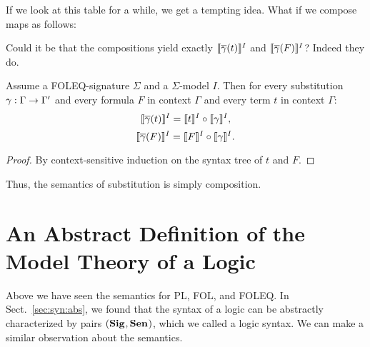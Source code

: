 If we look at this table for a while, we get a tempting idea. What if we compose maps as follows:

\begin{center}
\end{center}

Could it be that the compositions yield exactly $\llbracket \overline{\gamma}(t)\rrbracket^{I}$ and $\llbracket \overline{\gamma}(F)\rrbracket^{I}$? Indeed they do.

\begin{theorem}
Assume a FOLEQ-signature $\Sigma$ and a $\Sigma$-model $I$. Then for every substitution $\gamma:\Gamma\rightarrow\Gamma'$ and every formula $F$ in context $\Gamma$ and every term $t$ in context $\Gamma$:
 \[\llbracket \overline{\gamma}(t)\rrbracket^{I}=\llbracket t\rrbracket^{I}\circ\llbracket \gamma\rrbracket^{I},\]
 \[\llbracket \overline{\gamma}(F)\rrbracket^{I}=\llbracket F\rrbracket^{I}\circ\llbracket \gamma\rrbracket^{I}.\]
\end{theorem}
\begin{proof}
By context-sensitive induction on the syntax tree of $t$ and $F$.
\end{proof}

Thus, the semantics of substitution is simply composition.


\section{An Abstract Definition of the Model Theory of a Logic}\label{sec:mt:abs}

Above we have seen the semantics for PL, FOL, and FOLEQ. In Sect.~\ref{sec:syn:abs}, we found that the syntax of a logic can be abstractly characterized by pairs $({\mathbf{Sig}^{}},{\mathbf{Sen}^{}})$, which we called a logic syntax. We can make a similar observation about the semantics.

